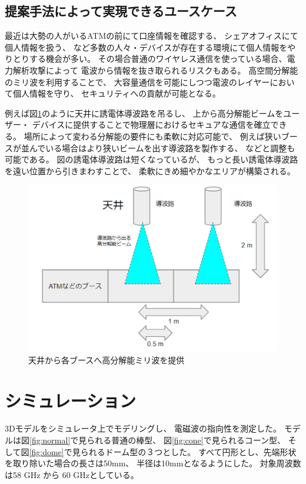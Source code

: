 \documentclass[technicalreport]{ieicej}
\begin{document}
\subsection{提案手法によって実現できるユースケース}

最近は大勢の人がいるATMの前にて口座情報を確認する、
シェアオフィスにて個人情報を扱う、
など多数の人々・デバイスが存在する環境にて個人情報をやりとりする機会が多い。
その場合普通のワイヤレス通信を使っている場合、電力解析攻撃によって
電波から情報を抜き取られるリスクもある。
高空間分解能のミリ波を利用することで、
大容量通信を可能にしつつ電波のレイヤーにおいて個人情報を守り、
セキュリティへの貢献が可能となる。

例えば図\ref{fig:usecase}のように天井に誘電体導波路を吊るし、
上から高分解能ビームをユーザー・
デバイスに提供することで物理層におけるセキュアな通信を確立できる。
場所によって変わる分解能の要件にも柔軟に対応可能で、
例えば狭いブースが並んでいる場合はより狭いビームを出す導波路を製作する、
などと調整も可能である。
図の誘電体導波路は短くなっているが、
もっと長い誘電体導波路を遠い位置から引きまわすことで、
柔軟にきめ細やかなエリアが構築される。

\begin{figure}[tb]
  \vspace{20mm}
  \begin{center}
    \includegraphics[bb=0 0 384 262, width=0.7\linewidth]{img/usecase.pdf}
    \caption{天井から各ブースへ高分解能ミリ波を提供}
    \label{fig:usecase}
  \end{center}
\end{figure}



\section{シミュレーション}

3Dモデルをシミュレータ上でモデリングし、
電磁波の指向性を測定した。
モデルは図\ref{fig:normal}で見られる普通の棒型、
図\ref{fig:cone}で見られるコーン型、
そして図\ref{fig:dome}で見られるドーム型の３つとした。
すべて円形とし、先端形状を取り除いた場合の長さは50mm、
半径は10mmとなるようにした。
対象周波数は58 GHz から 60 GHzとしている。
\end{document}
